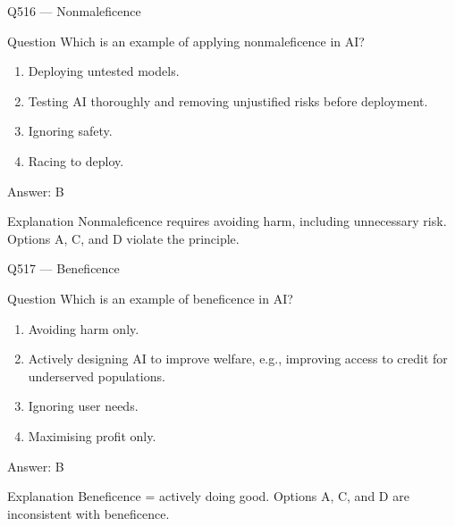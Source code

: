 \documentclass[aspectratio=169,8pt]{beamer}
\begin{document}
	\begin{frame}{Q516 --- Nonmaleficence}
		\begin{block}{Question}
			Which is an example of applying nonmaleficence in AI?
			\begin{enumerate}
				\item Deploying untested models.
				\item Testing AI thoroughly and removing unjustified risks before deployment.
				\item Ignoring safety.
				\item Racing to deploy.
			\end{enumerate}
		\end{block}
		\begin{exampleblock}{Answer: B}\end{exampleblock}
		\begin{block}{Explanation}
			Nonmaleficence requires avoiding harm, including unnecessary risk. Options A, C, and D violate the principle.
		\end{block}
	\end{frame}
	
	\begin{frame}{Q517 --- Beneficence}
		\begin{block}{Question}
			Which is an example of beneficence in AI?
			\begin{enumerate}
				\item Avoiding harm only.
				\item Actively designing AI to improve welfare, e.g., improving access to credit for underserved populations.
				\item Ignoring user needs.
				\item Maximising profit only.
			\end{enumerate}
		\end{block}
		\begin{exampleblock}{Answer: B}\end{exampleblock}
		\begin{block}{Explanation}
			Beneficence = actively doing good. Options A, C, and D are inconsistent with beneficence.
		\end{block}
	\end{frame}
	
\end{document}
